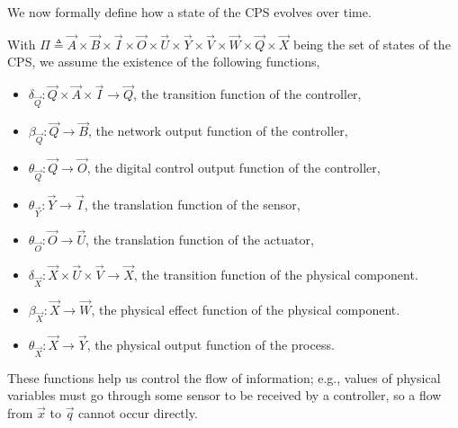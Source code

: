 We now formally define how a state of the CPS evolves over time.
{
\begin{definition}
\label{def:SingleCycleSemantics}
With $\Pi\triangleq \vec{A}\times\vec{B}\times\vec{I}\times\vec{O}\times\vec{U}\times\vec{Y}\times\vec{V}\times\vec{W}\times\vec{Q}\times\vec{X}$ being the set of states of the CPS, we assume the existence of the following functions,
\begin{itemize}
\item $\delta_{\vec{Q}}\colon \vec{Q}\times \vec{A}\times \vec{I} \rightarrow \vec{Q}$, the transition function of the controller,
\item $\beta_{\vec{Q}}\colon \vec{Q}\rightarrow \vec{B}$, the network output function of the controller,
\item $\theta_{\vec{Q}}\colon \vec{Q}\rightarrow \vec{O}$, the digital control output function of the controller,
\item $\theta_{\vec{Y}}\colon \vec{Y} \rightarrow \vec{I}$, the translation function of the sensor,
\item $\theta_{\vec{O}}\colon \vec{O} \rightarrow \vec{U}$, the translation function of the actuator,
\item $\delta_{\vec{X}}\colon \vec{X} \times \vec{U}\times \vec{V} \rightarrow \vec{X}$, the transition function of the physical component.
\item $\beta_{\vec{X}}\colon \vec{X}\rightarrow \vec{W}$, the physical effect function of the physical component.
\item $\theta_{\vec{X}}\colon \vec{X}\rightarrow \vec{Y}$, the physical output function of the process.
\end{itemize} 
These functions help us control the flow of information; e.g., values of physical variables must go through some sensor to be received by a controller, so a flow from $\vec{x}$ to $\vec{q}$ cannot occur directly. 


\end{definition}}
